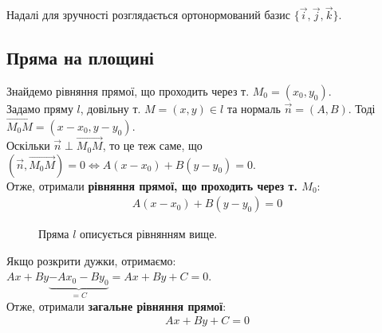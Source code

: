 \documentclass[a4paper, 10pt]{extarticle}
\theoremstyle{theoremdd}
\theoremstyle{theoremdd}
\theoremstyle{theoremdd}
\theoremstyle{theoremdd}
\theoremstyle{theoremdd}
\theoremstyle{theoremdd}
\theoremstyle{theoremdd}
\theoremstyle{theoremdd}
\begin{document}
Надалі для зручності розглядається ортонормований базис $\{\vec{i},\vec{j},\vec{k}\}$.

\subsection{Пряма на площині}
Знайдемо рівняння прямої, що проходить через т. $M_0 = (x_0,y_0)$.\\
Задамо пряму $l$, довільну т. $M = (x,y) \in l$ та нормаль $\vec{n} = (A,B)$. Тоді $\overrightarrow{M_0M} = (x-x_0, y-y_0)$.\\
Оскільки $\vec{n} \perp \overrightarrow{M_0 M}$, то це теж саме, що $(\vec{n}, \overrightarrow{M_0 M}) = 0 \iff A(x-x_0)+B(y-y_0)=0$.\\
Отже, отримали \textbf{рівняння прямої, що проходить через т. $M_0$}:
\begin{align*}
A(x-x_0) + B(y-y_0) = 0
\end{align*}

\begin{figure}[H]
\centering
{}
\caption*{Пряма $l$ описується рівнянням вище.}
\end{figure}

Якщо розкрити дужки, отримаємо:\\
$Ax + By \underbrace{-Ax_0 - By_0}_{= C} = Ax+By+C = 0$.\\
Отже, отримали \textbf{загальне рівняння прямої}:
\begin{align*}
Ax + By + C = 0
\end{align*}
\end{document}
